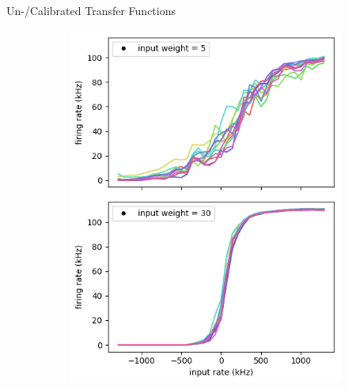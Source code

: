 \documentclass[12pt, aspectratio=169]{beamer}
\begin{document}
\begin{frame}{Un-/Calibrated Transfer Functions}
\begin{figure}[!htb]
\begin{figure}
                \includegraphics[scale=0.44]{calibrated_activation_function_input.png}
                \label{membrane_potential}
            \end{figure}
        \endminipage\hfill
    \end{figure}
\end{frame}
\end{document}
